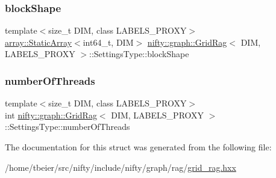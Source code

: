 \subsubsection{\texorpdfstring{block\+Shape}{blockShape}}
{\footnotesize\ttfamily template$<$size\+\_\+t D\+IM, class L\+A\+B\+E\+L\+S\+\_\+\+P\+R\+O\+XY$>$ \\
\hyperlink{namespacenifty_1_1array_a683f151f19c851754e0c6d55ed16a0c2}{array\+::\+Static\+Array}$<$int64\+\_\+t, D\+IM$>$ \hyperlink{classnifty_1_1graph_1_1GridRag}{nifty\+::graph\+::\+Grid\+Rag}$<$ D\+IM, L\+A\+B\+E\+L\+S\+\_\+\+P\+R\+O\+XY $>$\+::Settings\+Type\+::block\+Shape}

\mbox{\label{structnifty_1_1graph_1_1GridRag_1_1SettingsType_a2296f315ec18eac36fd00c16d43fb6a7}} 
\subsubsection{\texorpdfstring{number\+Of\+Threads}{numberOfThreads}}
{\footnotesize\ttfamily template$<$size\+\_\+t D\+IM, class L\+A\+B\+E\+L\+S\+\_\+\+P\+R\+O\+XY$>$ \\
int \hyperlink{classnifty_1_1graph_1_1GridRag}{nifty\+::graph\+::\+Grid\+Rag}$<$ D\+IM, L\+A\+B\+E\+L\+S\+\_\+\+P\+R\+O\+XY $>$\+::Settings\+Type\+::number\+Of\+Threads}



The documentation for this struct was generated from the following file\+:\begin{DoxyCompactItemize}
\item 
/home/tbeier/src/nifty/include/nifty/graph/rag/\hyperlink{grid__rag_8hxx}{grid\+\_\+rag.\+hxx}\end{DoxyCompactItemize}

